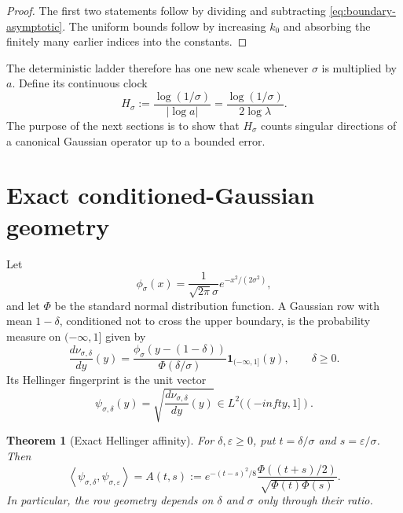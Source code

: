 \documentclass[11pt]{article}
\newtheorem{theorem}{Theorem}[section]
\theoremstyle{definition}
\theoremstyle{remark}
\newcommand{\Hilbert}{L^2((-infty,1])}
\begin{document}
\begin{proof}
The first two statements follow by dividing and subtracting
\eqref{eq:boundary-asymptotic}.  The uniform bounds follow by increasing
$k_0$ and absorbing the finitely many earlier indices into the constants.
\end{proof}

The deterministic ladder therefore has one new scale whenever $\sigma$ is
multiplied by $a$.  Define its continuous clock
\begin{equation}\label{eq:clock}
 H_\sigma
 :=\frac{\log(1/\sigma)}{|\log a|}
 =\frac{\log(1/\sigma)}{2\log\lambda}.
\end{equation}
The purpose of the next sections is to show that $H_\sigma$ counts singular
directions of a canonical Gaussian operator up to a bounded error.

\section{Exact conditioned-Gaussian geometry}
\label{sec:gaussian-geometry}

Let
\begin{equation}\label{eq:normal-density}
 \phi_\sigma(x)=\frac1{\sqrt{2\pi}\sigma}
 e^{-x^2/(2\sigma^2)},
\end{equation}
and let $\Phi$ be the standard normal distribution function.  A Gaussian row
with mean $1-\delta$, conditioned not to cross the upper boundary, is the
probability measure on $(-\infty,1]$ given by
\begin{equation}\label{eq:conditioned-row}
 \frac{d\nu_{\sigma,\delta}}{dy}(y)
 =\frac{\phi_\sigma(y-(1-\delta))}{\Phi(\delta/\sigma)}
 \mathbf1_{(-\infty,1]}(y),
 \qquad \delta\ge0.
\end{equation}
Its Hellinger fingerprint is the unit vector
\begin{equation}\label{eq:fingerprint}
 \psi_{\sigma,\delta}(y)
 =\sqrt{\frac{d\nu_{\sigma,\delta}}{dy}(y)}
 \in\Hilbert.
\end{equation}

\begin{theorem}[Exact Hellinger affinity]
\label{thm:affinity}
For $\delta,\varepsilon\ge0$, put
$t=\delta/\sigma$ and $s=\varepsilon/\sigma$.  Then
\begin{equation}\label{eq:affinity}
 \boxed{
 \left\langle\psi_{\sigma,\delta},
 \psi_{\sigma,\varepsilon}\right\rangle
 =A(t,s)
 :=e^{-(t-s)^2/8}
 \frac{\Phi((t+s)/2)}{\sqrt{\Phi(t)\Phi(s)}}.}
\end{equation}
In particular, the row geometry depends on $\delta$ and $\sigma$ only through
their ratio.
\end{theorem}
\end{document}
